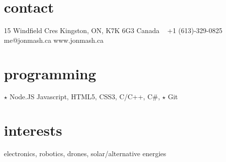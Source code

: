 
\begin{aside}
%
\section{contact}
15 Windfield Cres
Kingston, ON, K7K 6G3
Canada
~
+1 (613)-329-0825
~
me@jonmash.ca
www.jonmash.ca
%
\section{programming}
{\color{orange} $\star$} Node.JS
Javascript, HTML5, CSS3, C/C++, C\#, 
{\color{orange} $\star$} Git
%
\section{interests}
electronics, robotics, drones, solar/alternative energies
%
\end{aside}